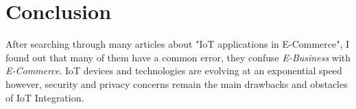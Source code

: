 \documentclass[10pt,journal,compsoc]{IEEEtran}
\begin{document}




	\section{Conclusion}
	After searching through many articles about "IoT applications in E-Commerce", I found out that many of them have a common error, they confuse \emph{E-Business} with \emph{E-Commerce}.
	IoT devices and technologies are evolving at an exponential speed however, security and privacy concerns remain the main drawbacks
	and obstacles of IoT Integration.






\end{document}
